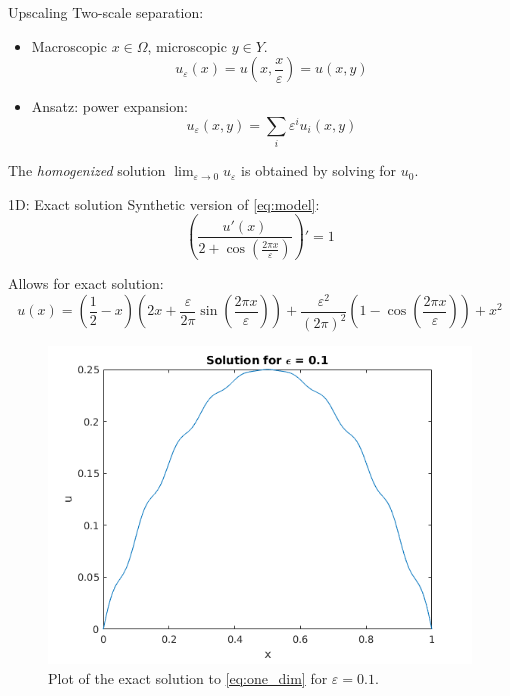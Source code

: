 \documentclass{beamer}
\renewcommand{\epsilon}{\varepsilon}
\begin{document}
\begin{frame}[t]{Upscaling}
    Two-scale separation: \begin{itemize}
        \item Macroscopic $x \in \Omega$, microscopic $y \in Y$.
        \[u_\varepsilon(x) = u(x,\frac{x}{\varepsilon}) = u(x,y)\]
        \item Ansatz: power expansion:
        \begin{equation*}
            u_\varepsilon(x,y) = \sum_i \varepsilon^i u_i(x,y)
            \label{eq:pow_exp}
        \end{equation*}
    \end{itemize}
    The \emph{homogenized} solution $\lim_{\varepsilon\to 0} u_\varepsilon$ is obtained by solving for $u_0$.
\end{frame}


\begin{frame}[t]{1D: Exact solution}
  Synthetic version of \eqref{eq:model}:
  \begin{equation}
    \left( \frac{u'(x)}{2+\cos \left( \frac{2\pi x}{\epsilon} \right)} \right)' = 1
    \label{eq:one_dim}
  \end{equation}

  Allows for exact solution:
  \begin{equation}
    u(x) = \left( \frac{1}{2} - x \right) \left(2x + \frac{\epsilon}{2\pi}\sin\left(\frac{2\pi x}{\epsilon}\right) \right) + \frac{\epsilon^{2}}{(2\pi)^{2}}\left( 1 - \cos \left( \frac{2 \pi x}{\epsilon} \right) \right) + x^{2}
   \label{eq:one_dim_sol}
 \end{equation}
 \begin{figure}[th]
    \centering
    \includegraphics[width=0.35\linewidth]{one_dim_exact.png}
    \caption{Plot of the exact solution to \eqref{eq:one_dim} for $\epsilon=0.1 $.}
    \label{fig:one_dim_exact}
\end{figure}
\end{frame}
\end{document}
